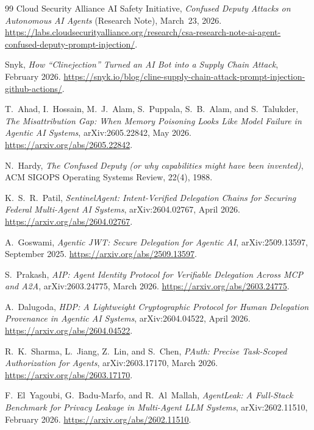 \documentclass[11pt]{article}
\begin{document}
\begin{thebibliography}{99}
 Cloud Security Alliance AI Safety Initiative, \emph{Confused
Deputy Attacks on Autonomous AI Agents} (Research Note), March~23, 2026.
\url{https://labs.cloudsecurityalliance.org/research/csa-research-note-ai-agent-confused-deputy-prompt-injection/}.

 Snyk, \emph{How ``Clinejection'' Turned an AI Bot into a
Supply Chain Attack}, February 2026.
\url{https://snyk.io/blog/cline-supply-chain-attack-prompt-injection-github-actions/}.

 T.~Ahad, I.~Hossain, M.~J.~Alam, S.~Puppala,
S.~B.~Alam, and S.~Talukder, \emph{The Misattribution Gap: When Memory Poisoning
Looks Like Model Failure in Agentic AI Systems}, arXiv:2605.22842, May 2026.
\url{https://arxiv.org/abs/2605.22842}.

 N.~Hardy, \emph{The Confused Deputy (or why capabilities might
have been invented)}, ACM SIGOPS Operating Systems Review, 22(4), 1988.

 K.~S.~R.~Patil, \emph{SentinelAgent: Intent-Verified
Delegation Chains for Securing Federal Multi-Agent AI Systems}, arXiv:2604.02767,
April 2026. \url{https://arxiv.org/abs/2604.02767}.

 A.~Goswami, \emph{Agentic JWT: Secure Delegation for Agentic AI},
arXiv:2509.13597, September 2025. \url{https://arxiv.org/abs/2509.13597}.

 S.~Prakash, \emph{AIP: Agent Identity Protocol for Verifiable
Delegation Across MCP and A2A}, arXiv:2603.24775, March 2026.
\url{https://arxiv.org/abs/2603.24775}.

 A.~Dalugoda, \emph{HDP: A Lightweight Cryptographic Protocol for
Human Delegation Provenance in Agentic AI Systems}, arXiv:2604.04522, April 2026.
\url{https://arxiv.org/abs/2604.04522}.

 R.~K.~Sharma, L.~Jiang, Z.~Lin, and S.~Chen, \emph{PAuth:
Precise Task-Scoped Authorization for Agents}, arXiv:2603.17170, March 2026.
\url{https://arxiv.org/abs/2603.17170}.

 F.~El~Yagoubi, G.~Badu-Marfo, and R.~Al~Mallah, \emph{AgentLeak:
A Full-Stack Benchmark for Privacy Leakage in Multi-Agent LLM Systems},
arXiv:2602.11510, February 2026. \url{https://arxiv.org/abs/2602.11510}.

\end{thebibliography}
\end{document}
